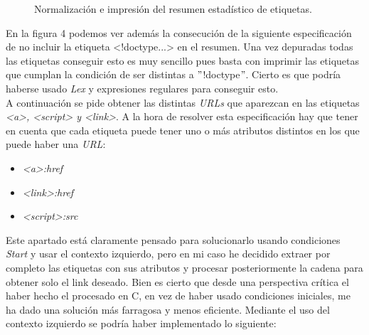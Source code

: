 \documentclass[10pt, a4paper,spanish]{article}
\begin{document}
\begin{figure}[H]
  \centering
  \caption{Normalización e impresión del resumen estadístico de etiquetas.}
\end{figure}

\noindent En la figura 4 podemos ver además la consecución de la siguiente especificación de no incluir la etiqueta <!doctype...> en el resumen. Una vez depuradas todas las etiquetas conseguir esto es muy sencillo pues basta con imprimir las etiquetas que cumplan la condición de ser distintas a $"$!doctype$"$. Cierto es que podría haberse usado \textit{Lex} y expresiones regulares para conseguir esto. \\

\noindent A continuación se pide obtener las distintas \textit{URLs} que aparezcan en las etiquetas \textit{<a>, <script> y <link>}. A la hora de resolver esta especificación hay que tener en cuenta que cada etiqueta puede tener uno o más atributos distintos en los que puede haber una \textit{URL}:
\begin{itemize}
    \item \textit{<a>:href}
    \item \textit{<link>:href}
    \item \textit{<script>:src}
\end{itemize}

\noindent Este apartado está claramente pensado para solucionarlo usando condiciones \textit{Start} y usar el contexto izquierdo, pero en mi caso he decidido extraer por completo las etiquetas con sus atributos y procesar posteriormente la cadena para obtener solo el link deseado. Bien es cierto que desde una perspectiva crítica el haber hecho el procesado en C, en vez de haber usado condiciones iniciales, me ha dado una solución más farragosa y menos eficiente. Mediante el uso del contexto izquierdo se podría haber implementado lo siguiente:
\end{document}
